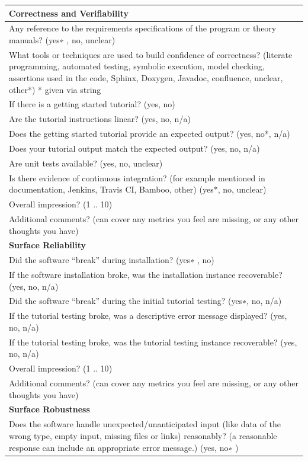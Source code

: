 \documentclass[12pt, notitlepage]{article}
\begin{document}
\begin{singlespace}
\def\arraystretch{1.33}
\begin{tabular}{p{16cm}}
	\hline		
	\textbf{Correctness and Verifiability}\\
	\hline
	Any reference to the requirements specifications of the program or theory manuals? ({yes∗ , no, unclear})\\
	What tools or techniques are used to build confidence of correctness? ({literate programming, automated testing, symbolic execution, model checking, assertions used in the code, Sphinx, Doxygen, Javadoc, confluence, unclear, other*}) * given via string\\
	If there is a getting started tutorial? ({yes, no})\\
	Are the tutorial instructions linear? ({yes, no, n/a})\\
	Does the getting started tutorial provide an expected output? ({yes, no*, n/a})\\
	Does your tutorial output match the expected output? ({yes, no, n/a})\\
	Are unit tests available?  ({yes, no, unclear})\\
	Is there evidence of continuous integration? (for example mentioned in documentation, Jenkins, Travis CI, Bamboo, other) ({yes*, no, unclear})\\
	Overall impression? ({1 .. 10})\\
	Additional comments? (can cover any metrics you feel are missing, or any other thoughts you have) \\
	\hline	
	\textbf{Surface Reliability}\\
	\hline
	Did the software “break” during installation? ({yes∗ , no})\\
	If the software installation broke, was the installation instance recoverable? ({yes, no, n/a})\\
	Did the software “break” during the initial tutorial testing? ({yes∗, no, n/a})\\
	If the tutorial testing broke, was a descriptive error message displayed? ({yes, no, n/a})\\
	If the tutorial testing broke, was the tutorial testing instance recoverable? ({yes, no, n/a})\\
	Overall impression? ({1 .. 10})\\
	Additional comments? (can cover any metrics you feel are missing, or any other thoughts you have)\\
	\hline		
	\textbf{Surface Robustness}\\
	\hline
	Does the software handle unexpected/unanticipated input (like data of the wrong type, empty input, missing files or links) reasonably? (a reasonable response can include an appropriate error message.) ({yes, no∗ })\\

\end{tabular}
\end{singlespace}
\end{document}
